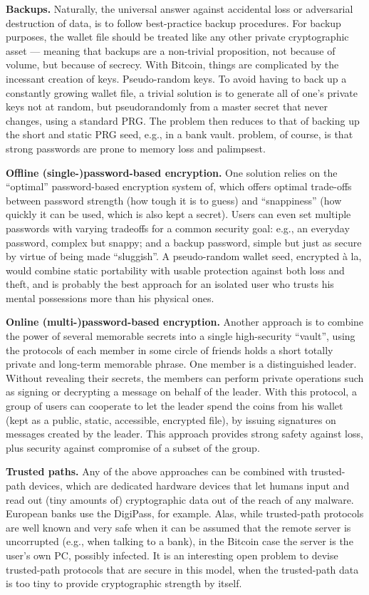 \textbf{Backups.} Naturally, the universal answer against accidental loss or adversarial destruction
of data, is to follow best-practice backup procedures. For backup purposes, the
wallet file should be treated like any other private cryptographic asset — meaning that
backups are a non-trivial proposition, not because of volume, but because of secrecy.
With Bitcoin, things are complicated by the incessant creation of keys.
Pseudo-random keys. To avoid having to back up a constantly growing wallet file,
a trivial solution is to generate all of one’s private keys not at random, but pseudorandomly
from a master secret that never changes, using a standard PRG. The problem
then reduces to that of backing up the short and static PRG seed, e.g., in a bank vault.
problem, of course, is that strong passwords are prone to memory loss and palimpsest.

\textbf{Offline (single-)password-based encryption.} One solution relies on the “optimal”
password-based encryption system of, which offers optimal trade-offs between password
strength (how tough it is to guess) and “snappiness” (how quickly it can be used,
which is also kept a secret). Users can even set multiple passwords with varying tradeoffs
for a common security goal: e.g., an everyday password, complex but snappy; and
a backup password, simple but just as secure by virtue of being made “sluggish”. A
pseudo-random wallet seed, encrypted à la, would combine static portability with
usable protection against both loss and theft, and is probably the best approach for an
isolated user who trusts his mental possessions more than his physical ones.

\textbf{Online (multi-)password-based encryption.} Another approach is to combine the power
of several memorable secrets into a single high-security “vault”, using the protocols of 
each member in some circle of friends holds a short totally private and long-term
memorable phrase. One member is a distinguished leader. Without revealing their secrets,
the members can perform private operations such as signing or decrypting a message
on behalf of the leader. With this protocol, a group of users can cooperate to let
the leader spend the coins from his wallet (kept as a public, static, accessible, encrypted
file), by issuing signatures on messages created by the leader. This approach provides
strong safety against loss, plus security against compromise of a subset of the group.

\textbf{Trusted paths.} Any of the above approaches can be combined with trusted-path devices,
which are dedicated hardware devices that let humans input and read out (tiny
amounts of) cryptographic data out of the reach of any malware. European banks use
the DigiPass, for example. Alas, while trusted-path protocols are well known and very
safe when it can be assumed that the remote server is uncorrupted (e.g., when talking
to a bank), in the Bitcoin case the server is the user’s own PC, possibly infected. It is an
interesting open problem to devise trusted-path protocols that are secure in this model,
when the trusted-path data is too tiny to provide cryptographic strength by itself.

